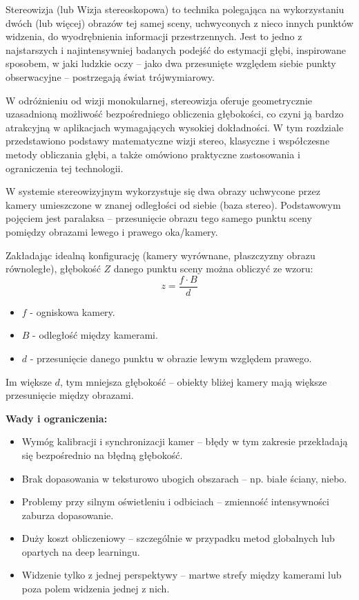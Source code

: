\documentclass[magisterska]{pracadypl}
\begin{document}
Stereowizja (lub Wizja stereoskopowa) to technika polegająca na wykorzystaniu dwóch (lub więcej) obrazów tej samej sceny, uchwyconych z nieco innych punktów widzenia, do wyodrębnienia informacji przestrzennych. Jest to jedno z najstarszych i najintensywniej badanych podejść do estymacji głębi, inspirowane sposobem, w jaki ludzkie oczy – jako dwa przesunięte względem siebie punkty obserwacyjne – postrzegają świat trójwymiarowy.

W odróżnieniu od wizji monokularnej, stereowizja oferuje geometrycznie uzasadnioną możliwość bezpośredniego obliczenia głębokości, co czyni ją bardzo atrakcyjną w aplikacjach wymagających wysokiej dokładności. W tym rozdziale przedstawiono podstawy matematyczne wizji stereo, klasyczne i współczesne metody obliczania głębi, a także omówiono praktyczne zastosowania i ograniczenia tej technologii.

W systemie stereowizyjnym wykorzystuje się dwa obrazy uchwycone przez kamery umieszczone w znanej odległości od siebie (baza stereo). Podstawowym pojęciem jest paralaksa – przesunięcie obrazu tego samego punktu sceny pomiędzy obrazami lewego i prawego oka/kamery.

Zakładając idealną konfigurację (kamery wyrównane, płaszczyzny obrazu równoległe), głębokość $Z$ danego punktu sceny można obliczyć ze wzoru:
\[
z = \frac{f \cdot B}{d}
\]
\begin{itemize}
  \item $f$ - ogniskowa kamery.
  \item $B$ - odległość między kamerami.
  \item $d$ - przesunięcie danego punktu w obrazie lewym względem prawego.
\end{itemize}

Im większe $d$, tym mniejsza głębokość – obiekty bliżej kamery mają większe przesunięcie między obrazami.

\begin{minipage}[t]{\textwidth}
\textbf{Wady i ograniczenia:}
\begin{itemize}
  \item Wymóg kalibracji i synchronizacji kamer – błędy w tym zakresie przekładają się bezpośrednio na błędną głębokość.

  \item Brak dopasowania w teksturowo ubogich obszarach – np. białe ściany, niebo.

  \item Problemy przy silnym oświetleniu i odbiciach – zmienność intensywności zaburza dopasowanie.

  \item Duży koszt obliczeniowy – szczególnie w przypadku metod globalnych lub opartych na deep learningu.

  \item Widzenie tylko z jednej perspektywy – martwe strefy między kamerami lub poza polem widzenia jednej z nich.
\end{itemize}
\end{minipage}
\end{document}
